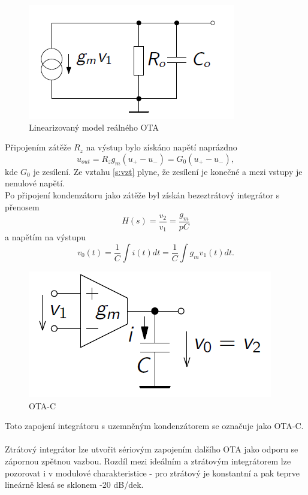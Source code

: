 \begin{figure}[h]
\centering
\includegraphics[scale=0.6]{gmrc.png}
\caption[Linearizovaný model reálného OTA]{Linearizovaný model reálného OTA \cite{5}}
\end{figure}
\noindent Připojením zátěže $R_z$ na výstup bylo získáno napětí naprázdno
\begin{equation}\label{s:vzt}
u_{out} = R_zg_m(u_+ - u_-) = G_0(u_+ - u_-),
\end{equation}
kde $G_0$ je zesílení. Ze vztahu \ref{s:vzt} plyne, že zesílení je konečné a mezi vstupy je nenulové napětí. \\
\noindent Po připojení kondenzátoru jako zátěže byl získán bezeztrátový integrátor s přenosem
\begin{equation}
H(s) = \frac{v_2}{v_1} = \frac{g_m}{pC}
\end{equation}
\noindent a napětím na výstupu
\begin{equation}
v_0(t) = \frac{1}{C}\int i(t)dt = \frac{1}{C}\int g_mv_1(t)dt.
\end{equation}
\begin{figure}[h]
\centering
\includegraphics[scale=0.5]{otaintegrator.png}
\caption[OTA-C]{OTA-C \cite{5} \label{s:GM-C}}
\end{figure}
\noindent Toto zapojení integrátoru s uzemněným kondenzátorem se označuje jako OTA-C.\\
\\
Ztrátový integrátor lze utvořit sériovým zapojením dalšího OTA jako odporu se zápornou zpětnou vazbou. Rozdíl mezi ideálním a ztrátovým integrátorem lze pozorovat i v modulové charakteristice - pro ztrátový je konstantní a pak teprve lineárně klesá se sklonem -20 dB/dek.\\
